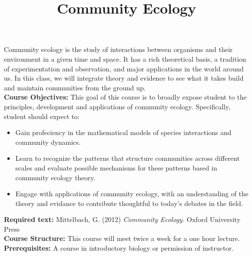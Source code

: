 \documentclass[12pt]{article}\usepackage[]{graphicx}\usepackage[]{color}
\begin{document}
\title{Community Ecology}
\date{}
\maketitle{}
Community ecology is the study of interactions between organisms and their environment in a given time and space. It has a rich theoretical basis, a tradition of experimentation and observation, and major applications in the world around us. In this class, we will integrate theory and evidence to see what it takes build and maintain communities from the ground up. \\

\textbf{Course Objectives:} This goal of this course is to broadly expose student to the principles, development and applications of community ecology. Specifically, student should expect to:
\begin{itemize}
\item Gain profeciency in the mathematical models of species interactions and community dynamics.
\item Learn to recognize the patterns that structure communities across different scales and evaluate possible mechanisms for these patterns based in community ecology theory.
\item Engage with applications of community ecology, with an understanding of the theory and evidance to contribute thoughtful to today's debates in the field.
\end{itemize}
\textbf{Required text:} Mittelbach, G. (2012) \textit{Community Ecology.} Oxford University Press \\
\textbf{Course Structure:} This course will meet twice a week for a one hour lecture.\\
\textbf{Prerequisites:} A course in introductory biology or permission of instructor.\\
\end{document}
